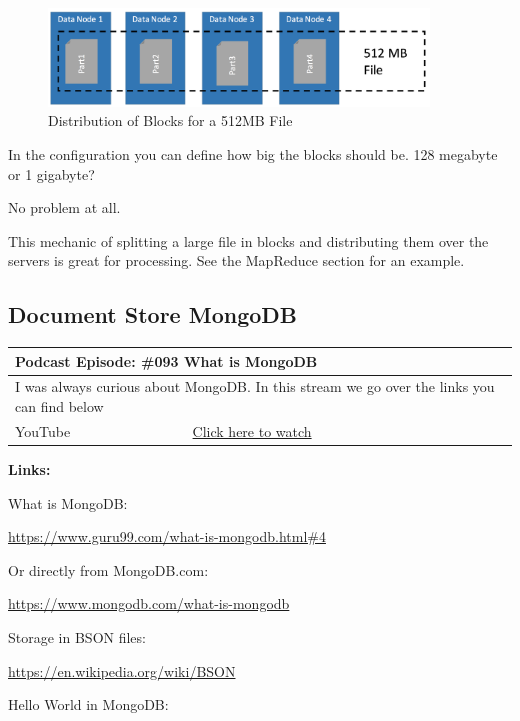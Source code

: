 \documentclass[12pt, numbers=noenddot]{scrreprt} %
\begin{document}
\begin{figure}[htbp]
  \centering
     \includegraphics[width=0.9\textwidth]{images/HDFS-Distributed-FileSystem.png}
  \caption{Distribution of Blocks for a 512MB File}
  \label{fig:Bild1}
\end{figure}

In the configuration you can define how big the blocks should be. 128 megabyte or 1 gigabyte?

No problem at all.

This mechanic of splitting a large file in blocks and distributing them over the servers is great for processing.
See the MapReduce section for an example.

\subsection{Document Store MongoDB}

\begin{table}[h]
\begin{tabular}{ll}
\hline
\multicolumn{2}{l}{\textbf{Podcast Episode:} \#093 What is MongoDB} \\ \hline
\multicolumn{2}{p{15cm}}{I was always curious about MongoDB. In this stream we go over the links you can find below}         \\ \hline
\multicolumn{1}{l|}{YouTube}   & \href{https://youtu.be/U05knQN29FA}{Click here to watch}   \\  \hline
\end{tabular}
\end{table}

\textbf{Links:}

What is MongoDB:

\url{https://www.guru99.com/what-is-mongodb.html#4}

Or directly from MongoDB.com:

\url{https://www.mongodb.com/what-is-mongodb}

Storage in BSON files:

\url{https://en.wikipedia.org/wiki/BSON}

Hello World in MongoDB:
\end{document}
